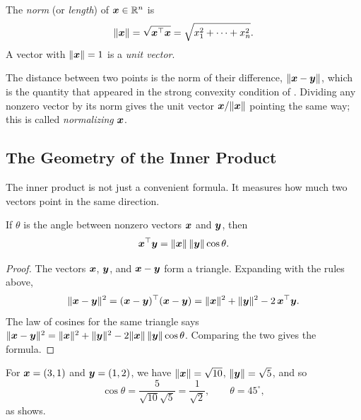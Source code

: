\begin{definition}[Norm]
  \label{def:norm}
  The \emph{norm} (or \emph{length}) of $\bm{x} \in \mathbb{R}^n$ is
  \[
    \|\bm{x}\| = \sqrt{\bm{x}^\top \bm{x}}
    = \sqrt{x_1^2 + \dots + x_n^2} .
  \]
  A vector with $\|\bm{x}\| = 1$ is a \emph{unit vector}.
\end{definition}

The distance between two points is the norm of their difference,
$\|\bm{x} - \bm{y}\|$, which is the quantity that appeared in the
strong convexity condition of . Dividing any nonzero
vector by its norm gives the unit vector $\bm{x} / \|\bm{x}\|$ pointing
the same way; this is called \emph{normalizing} $\bm{x}$.

\subsection{The Geometry of the Inner Product}
\label{sec:ch03-geometry}

The inner product is not just a convenient formula. It measures how much
two vectors point in the same direction.

\begin{proposition}
  \label{prop:ch03-angle}
  If $\theta$ is the angle between nonzero vectors $\bm{x}$ and
  $\bm{y}$, then
  \begin{equation}
    \bm{x}^\top \bm{y} = \|\bm{x}\| \, \|\bm{y}\| \cos \theta .
    \label{eq:ch03-angle}
  \end{equation}
\end{proposition}

\begin{proof}
  The vectors $\bm{x}$, $\bm{y}$, and $\bm{x} - \bm{y}$ form a
  triangle. Expanding with the rules above,
  \[
    \|\bm{x} - \bm{y}\|^2
    = (\bm{x} - \bm{y})^\top (\bm{x} - \bm{y})
    = \|\bm{x}\|^2 + \|\bm{y}\|^2 - 2\, \bm{x}^\top \bm{y} .
  \]
  The law of cosines for the same triangle says
  $\|\bm{x} - \bm{y}\|^2 = \|\bm{x}\|^2 + \|\bm{y}\|^2 -
  2 \|\bm{x}\| \, \|\bm{y}\| \cos \theta$. Comparing the two gives the
  formula.
\end{proof}

For $\bm{x} = (3, 1)$ and $\bm{y} = (1, 2)$, we have
$\|\bm{x}\| = \sqrt{10}$, $\|\bm{y}\| = \sqrt{5}$, and so
\[
  \cos \theta = \frac{5}{\sqrt{10} \sqrt{5}} = \frac{1}{\sqrt 2},
  \qquad \theta = 45^\circ ,
\]
as  shows.

